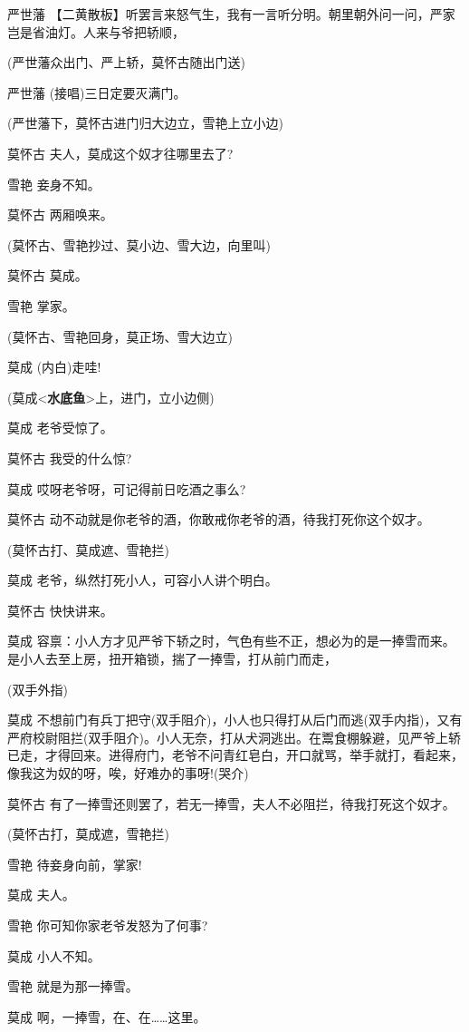 严世藩
【二黄散板】听罢言来怒气生，我有一言听分明。朝里朝外问一问，严家岂是省油灯。人来与爷把轿顺，

(严世藩众出门、严上轿，莫怀古随出门送)

严世藩 (接唱)三日定要灭满门。

(严世藩下，莫怀古进门归大边立，雪艳上立小边)

莫怀古 夫人，莫成这个奴才往哪里去了?

雪艳 妾身不知。

莫怀古 两厢唤来。

(莫怀古、雪艳抄过、莫小边、雪大边，向里叫)

莫怀古 莫成。

雪艳 掌家。

(莫怀古、雪艳回身，莫正场、雪大边立)

莫成 (内白)走哇!

(莫成\textless{}\textbf{水底鱼}\textgreater{}上，进门，立小边侧)

莫成 老爷受惊了。

莫怀古 我受的什么惊?

莫成 哎呀老爷呀，可记得前日吃酒之事么?

莫怀古 动不动就是你老爷的酒，你敢戒你老爷的酒，待我打死你这个奴才。

(莫怀古打、莫成遮、雪艳拦)

莫成 老爷，纵然打死小人，可容小人讲个明白。

莫怀古 快快讲来。

莫成
容禀：小人方才见严爷下轿之时，气色有些不正，想必为的是一捧雪而来。是小人去至上房，扭开箱锁，揣了一捧雪，打从前门而走，

(双手外指)

莫成
不想前门有兵丁把守(双手阻介)，小人也只得打从后门而逃(双手内指)，又有严府校尉阻拦(双手阻介)。小人无奈，打从犬洞逃出。在鬻食棚躲避，见严爷上轿已走，才得回来。进得府门，老爷不问青红皂白，开口就骂，举手就打，看起来，像我这为奴的呀，唉，好难办的事呀!(哭介)

莫怀古 有了一捧雪还则罢了，若无一捧雪，夫人不必阻拦，待我打死这个奴才。

(莫怀古打，莫成遮，雪艳拦)

雪艳 待妾身向前，掌家!

莫成 夫人。

雪艳 你可知你家老爷发怒为了何事?

莫成 小人不知。

雪艳 就是为那一捧雪。

莫成 啊，一捧雪，在、在\ldots{}\ldots{}这里。

